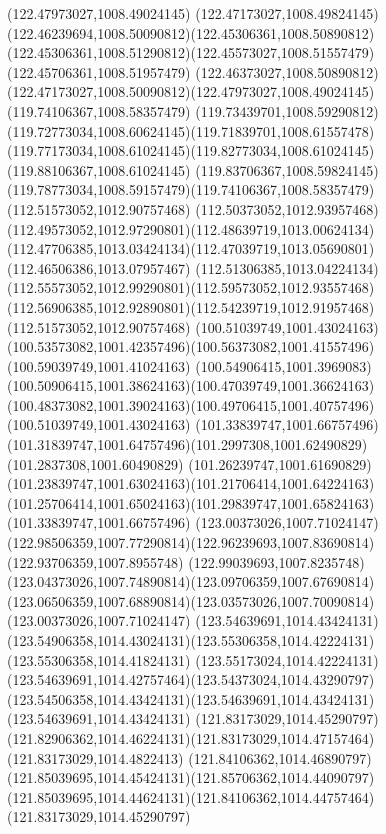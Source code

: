 {{		\moveto(122.47973027,1008.49024145)
		\curveto(122.47173027,1008.49824145)(122.46239694,1008.50090812)(122.45306361,1008.50890812)
		\curveto(122.45306361,1008.51290812)(122.45573027,1008.51557479)(122.45706361,1008.51957479)
		\curveto(122.46373027,1008.50890812)(122.47173027,1008.50090812)(122.47973027,1008.49024145)
		\moveto(119.74106367,1008.58357479)
		\curveto(119.73439701,1008.59290812)(119.72773034,1008.60624145)(119.71839701,1008.61557478)
		\curveto(119.77173034,1008.61024145)(119.82773034,1008.61024145)(119.88106367,1008.61024145)
		\curveto(119.83706367,1008.59824145)(119.78773034,1008.59157479)(119.74106367,1008.58357479)
		\moveto(112.51573052,1012.90757468)
		\curveto(112.50373052,1012.93957468)(112.49573052,1012.97290801)(112.48639719,1013.00624134)
		\curveto(112.47706385,1013.03424134)(112.47039719,1013.05690801)(112.46506386,1013.07957467)
		\curveto(112.51306385,1013.04224134)(112.55573052,1012.99290801)(112.59573052,1012.93557468)
		\curveto(112.56906385,1012.92890801)(112.54239719,1012.91957468)(112.51573052,1012.90757468)
		\moveto(100.51039749,1001.43024163)
		\curveto(100.53573082,1001.42357496)(100.56373082,1001.41557496)(100.59039749,1001.41024163)
		\curveto(100.54906415,1001.3969083)(100.50906415,1001.38624163)(100.47039749,1001.36624163)
		\curveto(100.48373082,1001.39024163)(100.49706415,1001.40757496)(100.51039749,1001.43024163)
		\moveto(101.33839747,1001.66757496)
		\curveto(101.31839747,1001.64757496)(101.2997308,1001.62490829)(101.2837308,1001.60490829)
		\curveto(101.26239747,1001.61690829)(101.23839747,1001.63024163)(101.21706414,1001.64224163)
		\curveto(101.25706414,1001.65024163)(101.29839747,1001.65824163)(101.33839747,1001.66757496)
		\moveto(123.00373026,1007.71024147)
		\curveto(122.98506359,1007.77290814)(122.96239693,1007.83690814)(122.93706359,1007.8955748)
		\curveto(122.99039693,1007.8235748)(123.04373026,1007.74890814)(123.09706359,1007.67690814)
		\curveto(123.06506359,1007.68890814)(123.03573026,1007.70090814)(123.00373026,1007.71024147)
		\moveto(123.54639691,1014.43424131)
		\curveto(123.54906358,1014.43024131)(123.55306358,1014.42224131)(123.55306358,1014.41824131)
		\curveto(123.55173024,1014.42224131)(123.54639691,1014.42757464)(123.54373024,1014.43290797)
		\curveto(123.54506358,1014.43424131)(123.54639691,1014.43424131)(123.54639691,1014.43424131)
		\moveto(121.83173029,1014.45290797)
		\curveto(121.82906362,1014.46224131)(121.83173029,1014.47157464)(121.83173029,1014.4822413)
		\curveto(121.84106362,1014.46890797)(121.85039695,1014.45424131)(121.85706362,1014.44090797)
		\curveto(121.85039695,1014.44624131)(121.84106362,1014.44757464)(121.83173029,1014.45290797)
}}
